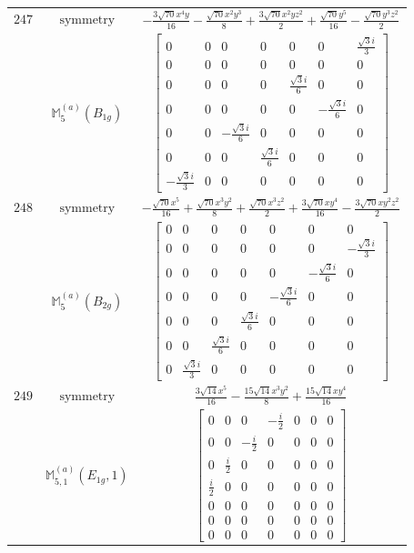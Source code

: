 \documentclass[fleqn,8pt,landscape]{jsarticle}
\begin{document}
\begin{longtable}{ccc}
$ 247 $ & $ \text{symmetry} $ & $ - \frac{3 \sqrt{70} x^{4} y}{16} - \frac{\sqrt{70} x^{2} y^{3}}{8} + \frac{3 \sqrt{70} x^{2} y z^{2}}{2} + \frac{\sqrt{70} y^{5}}{16} - \frac{\sqrt{70} y^{3} z^{2}}{2} $ \\
$  $ & $ \mathbb{M}_{5}^{(a)}(B_{1g}) $ & $ \begin{bmatrix} 0 & 0 & 0 & 0 & 0 & 0 & \frac{\sqrt{3} i}{3} \\ 0 & 0 & 0 & 0 & 0 & 0 & 0 \\ 0 & 0 & 0 & 0 & \frac{\sqrt{3} i}{6} & 0 & 0 \\ 0 & 0 & 0 & 0 & 0 & - \frac{\sqrt{3} i}{6} & 0 \\ 0 & 0 & - \frac{\sqrt{3} i}{6} & 0 & 0 & 0 & 0 \\ 0 & 0 & 0 & \frac{\sqrt{3} i}{6} & 0 & 0 & 0 \\ - \frac{\sqrt{3} i}{3} & 0 & 0 & 0 & 0 & 0 & 0 \end{bmatrix} $ \\ \hline
$ 248 $ & $ \text{symmetry} $ & $ - \frac{\sqrt{70} x^{5}}{16} + \frac{\sqrt{70} x^{3} y^{2}}{8} + \frac{\sqrt{70} x^{3} z^{2}}{2} + \frac{3 \sqrt{70} x y^{4}}{16} - \frac{3 \sqrt{70} x y^{2} z^{2}}{2} $ \\
$  $ & $ \mathbb{M}_{5}^{(a)}(B_{2g}) $ & $ \begin{bmatrix} 0 & 0 & 0 & 0 & 0 & 0 & 0 \\ 0 & 0 & 0 & 0 & 0 & 0 & - \frac{\sqrt{3} i}{3} \\ 0 & 0 & 0 & 0 & 0 & - \frac{\sqrt{3} i}{6} & 0 \\ 0 & 0 & 0 & 0 & - \frac{\sqrt{3} i}{6} & 0 & 0 \\ 0 & 0 & 0 & \frac{\sqrt{3} i}{6} & 0 & 0 & 0 \\ 0 & 0 & \frac{\sqrt{3} i}{6} & 0 & 0 & 0 & 0 \\ 0 & \frac{\sqrt{3} i}{3} & 0 & 0 & 0 & 0 & 0 \end{bmatrix} $ \\ \hline
$ 249 $ & $ \text{symmetry} $ & $ \frac{3 \sqrt{14} x^{5}}{16} - \frac{15 \sqrt{14} x^{3} y^{2}}{8} + \frac{15 \sqrt{14} x y^{4}}{16} $ \\
$  $ & $ \mathbb{M}_{5,1}^{(a)}(E_{1g},1) $ & $ \begin{bmatrix} 0 & 0 & 0 & - \frac{i}{2} & 0 & 0 & 0 \\ 0 & 0 & - \frac{i}{2} & 0 & 0 & 0 & 0 \\ 0 & \frac{i}{2} & 0 & 0 & 0 & 0 & 0 \\ \frac{i}{2} & 0 & 0 & 0 & 0 & 0 & 0 \\ 0 & 0 & 0 & 0 & 0 & 0 & 0 \\ 0 & 0 & 0 & 0 & 0 & 0 & 0 \\ 0 & 0 & 0 & 0 & 0 & 0 & 0 \end{bmatrix} $ \\ \hline

\end{longtable}
\end{document}
